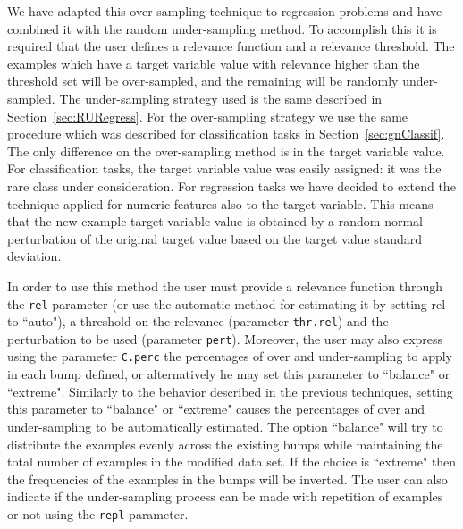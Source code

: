 \documentclass[10pt,a4paper]{article}\usepackage[]{graphicx}\usepackage[]{color}
\begin{document}
We have adapted this over-sampling technique to regression problems and have combined it with the random under-sampling method. To accomplish this it is required that the user defines a relevance function and a relevance threshold. The examples which have a target variable value with relevance higher than the threshold set will be over-sampled, and the remaining will be randomly under-sampled. The under-sampling strategy used is the same described in Section~\ref{sec:RURegress}. For the over-sampling strategy we use the same procedure which was described for classification tasks in Section~\ref{sec:gnClassif}. The only difference on the over-sampling method is in the target variable value. For classification tasks, the target variable value was easily assigned: it was the rare class under consideration. For regression tasks we have decided to extend the technique applied for numeric features also to the target variable. This means that the new example target variable value is obtained by a random normal perturbation of the original target value based on the target value standard deviation.

In order to use this method the user must provide a relevance function through the \texttt{rel} parameter (or use the automatic method for estimating it by setting rel to ``auto"), a threshold on the relevance (parameter \texttt{thr.rel}) and the perturbation to be used (parameter \texttt{pert}). Moreover, the user may also express using the parameter \texttt{C.perc} the percentages of over and under-sampling to apply in each bump defined, or alternatively he may set this parameter to ``balance" or ``extreme". Similarly to the behavior described in the previous techniques, setting this parameter to ``balance" or ``extreme" causes the percentages of over and under-sampling to be automatically estimated. The option ``balance" will try to distribute the examples evenly across the existing bumps while maintaining the total number of examples in the modified data set. If the choice is ``extreme" then the frequencies of the examples in the bumps will be inverted. The user can also indicate if the under-sampling process can be made with repetition of examples or not using the \texttt{repl} parameter.
\end{document}
